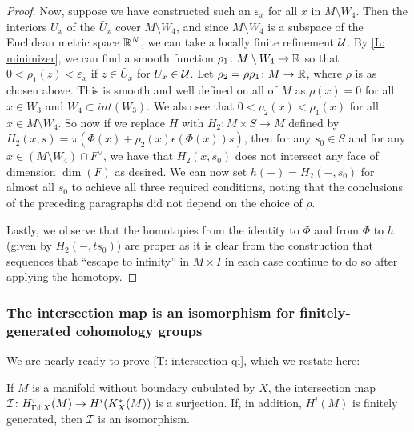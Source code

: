 \begin{proof}
	Now, suppose we have constructed such an $\varepsilon_x$ for all $x$ in $M \setminus W_4$.
	Then the interiors $U_x$ of the $\bar U_x$ cover $M \setminus W_4$, and since $M \setminus W_4$ is a subspace of the Euclidean metric space $\mathbb{R}^N$, we can take a locally finite refinement $\mathcal{U}$.
	By \cref{L: minimizer}, we can find a smooth function $\rho_1 \colon M \setminus W_4 \to \mathbb{R}$ so that $0<\rho_1(z)<\varepsilon_x$ if $z \in \bar U_x$ for $U_x \in \mathcal{U}$.
	Let $\rho_2 = \rho\rho_1 \colon M \to \mathbb{R}$, where $\rho$ is as chosen above.
	This is smooth and well defined on all of $M$ as $\rho(x) = 0$ for all $x \in W_3$ and $W_4 \subset int(W_3)$.
	We also see that $0<\rho_2(x)<\rho_1(x)$ for all $x \in M \setminus W_4$.
	So now if we replace $H$ with $H_2 \colon M \times S \to M$ defined by $H_2(x,s) = \pi(\Phi(x)+\rho_2(x)\epsilon(\Phi(x)) s)$, then for any $s_0 \in S$ and for any $x \in (M \setminus W_4) \cap F^\vee$, we have that $H_2(x,s_0)$ does not intersect any face of dimension $\dim(F)$ as desired.
	We can now set $h(-) = H_2(-,s_0)$ for almost all $s_0$ to achieve all three required conditions, noting that the conclusions of the preceding paragraphs did not depend on the choice of $\rho$.


	Lastly, we observe that the homotopies from the identity to $\Phi$ and from $\Phi$ to $h$ (given by $H_2(-,ts_0)$) are proper as it is clear from the construction that sequences that ``escape to infinity'' in $M \times I$ in each case continue to do so after applying the homotopy.
\end{proof}

\subsubsection{The intersection map is an isomorphism for finitely-generated cohomology groups}

We are nearly ready to prove \cref{T: intersection qi}, which we restate here:



\begin{theorem*}
	If $M$ is a manifold without boundary cubulated by $X$, the intersection map $\mathcal{I} \colon H^i_{\Gamma \pitchfork X}(M) \to H^i(K_X^*(M))$ is a surjection.
	If, in addition, $H^i(M)$ is finitely generated, then $\mathcal{I}$ is an isomorphism.
\end{theorem*}

